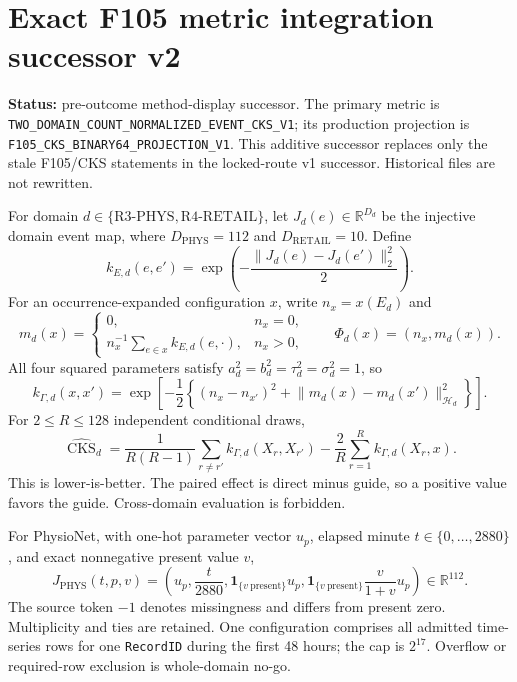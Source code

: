 \section*{Exact F105 metric integration successor v2}

\textbf{Status:} pre-outcome method-display successor. The primary metric is
\texttt{TWO\_DOMAIN\_COUNT\_NORMALIZED\_EVENT\_CKS\_V1}; its production
projection is \texttt{F105\_CKS\_BINARY64\_PROJECTION\_V1}. This additive
successor replaces only the stale F105/CKS statements in the locked-route v1
successor. Historical files are not rewritten.

For domain $d\in\{\mathrm{R3\mbox{-}PHYS},\mathrm{R4\mbox{-}RETAIL}\}$, let
$J_d(e)\in\mathbb R^{D_d}$ be the injective domain event map, where
$D_{\mathrm{PHYS}}=112$ and $D_{\mathrm{RETAIL}}=10$. Define
\[
k_{E,d}(e,e')=\exp\!\left(-\frac{\lVert J_d(e)-J_d(e')\rVert_2^2}{2}\right).
\]
For an occurrence-expanded configuration $x$, write $n_x=x(E_d)$ and
\[
m_d(x)=
\begin{cases}
0,&n_x=0,\\
n_x^{-1}\sum_{e\in x}k_{E,d}(e,\cdot),&n_x>0,
\end{cases}
\qquad \Phi_d(x)=(n_x,m_d(x)).
\]
All four squared parameters satisfy
$a_d^2=b_d^2=\tau_d^2=\sigma_d^2=1$, so
\[
k_{\Gamma,d}(x,x')=\exp\!\left[-\frac12\left\{
(n_x-n_{x'})^2+\lVert m_d(x)-m_d(x')\rVert_{\mathcal H_d}^2
\right\}\right].
\]
For $2\le R\le128$ independent conditional draws,
\[
\widehat{\operatorname{CKS}}_d
=\frac{1}{R(R-1)}\sum_{r\ne r'}k_{\Gamma,d}(X_r,X_{r'})
-\frac{2}{R}\sum_{r=1}^{R}k_{\Gamma,d}(X_r,x).
\]
This is lower-is-better. The paired effect is direct minus guide, so a
positive value favors the guide. Cross-domain evaluation is forbidden.

For PhysioNet, with one-hot parameter vector $u_p$, elapsed minute
$t\in\{0,\ldots,2880\}$, and exact nonnegative present value $v$,
\[
J_{\mathrm{PHYS}}(t,p,v)=\left(
u_p,\frac{t}{2880},
\mathbf 1_{\{v\ \mathrm{present}\}}u_p,
\mathbf 1_{\{v\ \mathrm{present}\}}\frac{v}{1+v}u_p
\right)\in\mathbb R^{112}.
\]
The source token $-1$ denotes missingness and differs from present zero.
Multiplicity and ties are retained. One configuration comprises all admitted
time-series rows for one \texttt{RecordID} during the first 48 hours; the cap
is $2^{17}$. Overflow or required-row exclusion is whole-domain no-go.

